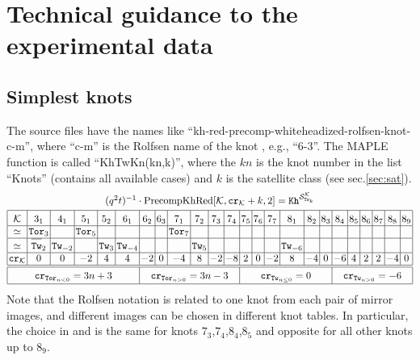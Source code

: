\documentclass[11pt]{article}
\def\be{\begin{eqnarray}}
\def\ee{\end{eqnarray}}
\def\Km{\mathcal{K}}
\def\Sm{\mathcal{S}}
\def\Kh{\mathtt{Kh}}
\def\Tor{\mathtt{Tor}}
\def\Tw{\mathtt{Tw}}
\def\Cr{\mathtt{cr}}
\begin{document}
\section{Technical guidance to the experimental data\label{app:data}}

\subsection{Simplest knots}
The source files have the names like ``kh-red-precomp-whiteheadized-rolfsen-knot-c-m'', where ``c-m'' is the Rolfsen name of the knot \cite{katlas}, e.g., ``6-3''. The MAPLE function is called ``KhTwKn(kn,k)'', where the $kn$ is the knot number in the list ``Knots'' (contains all available cases) and $k$ is the satellite class (see sec.\ref{sec:sat}). 
\be
\arraycolsep=0.5mm
\begin{array}{|c|c|c|c|c|c|c|c|c|c|c|c|c|c|c|c|c|c|c|c|c|c|c|c|}
\multicolumn{24}{c}{(q^2t)^{-1}\cdot \mathrm{PrecompKhRed}[\Km,\Cr_{\Km}+k,2]=\Kh^{\Sm_{\Tw_k}^{\Km}}}\\[1mm]
\hline\rule{0pt}{4mm}
\Km&3_1&4_1&5_1&5_2&6_1&6_2&6_3&7_1&7_2&7_3&7_4&7_5&7_6&7_7&8_1
&8_2&8_3&8_4&8_5&8_6&8_7&8_8&8_9\\
\hline
\simeq&\Tor_{3}&&\Tor_5&&&&&\Tor_7&&&&&&&&&&&&&&&\\
\hline
\simeq&\rule{0pt}{3mm}\overline{\rule{0pt}{3mm}\Tw}_{2}&\Tw_{-2}&&\Tw_3&\Tw_{-4}&&&&\Tw_5&&&&&&\Tw_{-6}&&&&&&&&\\
\hline
\Cr_{\Km}&0&0&-2&4&4&-2&0&-4&8&-2&-8&2&0&-2&8&-4&0&-6&4&2&2&-4&0\\
\hline\hline
\multicolumn{6}{|c|}{\rule{0pt}{4mm}\Cr_{\Tor_{n<0}}=3n+3}&\multicolumn{6}{c|}{\Cr_{\Tor_{n>0}}=3n-3}&
 \multicolumn{6}{c|}{\Cr_{\Tw_{n\le0}}=0}&\multicolumn{6}{c|}{\Cr_{\Tw_{n>0}}=-6}\\[0.5mm]
\hline
\end{array}
\label{RolfData}
\ee
Note that the Rolfsen notation is related to one knot from each pair of mirror images, and different images can be chosen in different knot tables. In particular, the choice in \cite{katlas,knbook} and \cite{indknot} is the same for knots $7_3$,$7_4$,$8_4$,$8_5$ and opposite for all other knots up to $8_9$.
\end{document}
